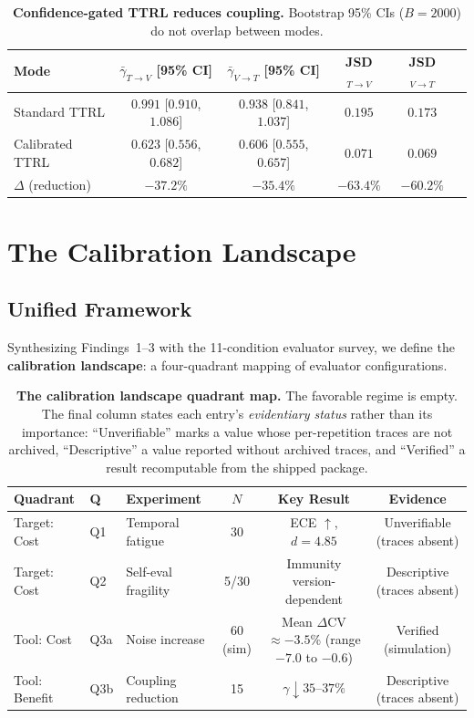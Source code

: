 \documentclass[11pt]{article}
\theoremstyle{definition}
\theoremstyle{remark}
\begin{document}
\begin{table}[H]
\centering
\caption{\textbf{Confidence-gated TTRL reduces coupling.} Bootstrap 95\% CIs ($B{=}2000$) do not overlap between modes.}
\label{tab:coupling}
\begin{tabular}{@{}lccccc@{}}
\toprule
Mode & $\bar{\gamma}_{T \to V}$ [95\% CI] & $\bar{\gamma}_{V \to T}$ [95\% CI] & JSD$_{T \to V}$ & JSD$_{V \to T}$ \\
\midrule
Standard TTRL & $0.991$ [$0.910$, $1.086$] & $0.938$ [$0.841$, $1.037$] & $0.195$ & $0.173$ \\
Calibrated TTRL & $0.623$ [$0.556$, $0.682$] & $0.606$ [$0.555$, $0.657$] & $0.071$ & $0.069$ \\
\midrule
$\Delta$ (reduction) & $-37.2\%$ & $-35.4\%$ & $-63.4\%$ & $-60.2\%$ \\
\bottomrule
\end{tabular}
\end{table}

\section{The Calibration Landscape}

\subsection{Unified Framework}

Synthesizing Findings~1--3 with the 11-condition evaluator survey, we define the \textbf{calibration landscape}: a four-quadrant mapping of evaluator configurations.

\begin{table}[H]
\centering
\caption{\textbf{The calibration landscape quadrant map.} The favorable regime is empty. The final column states each entry's \emph{evidentiary status} rather than its importance: ``Unverifiable'' marks a value whose per-repetition traces are not archived, ``Descriptive'' a value reported without archived traces, and ``Verified'' a result recomputable from the shipped package.}
\begin{tabular}{@{}lllccc@{}}
\toprule
Quadrant & Q & Experiment & $N$ & Key Result & Evidence \\
\midrule
Target: Cost & Q1 & Temporal fatigue & 30 & ECE $\uparrow$, $d{=}4.85$ & Unverifiable (traces absent) \\
Target: Cost & Q2 & Self-eval fragility & 5/30 & Immunity version-dependent & Descriptive (traces absent) \\
Tool: Cost & Q3a & Noise increase & 60 (sim) & Mean $\Delta$CV $\approx -3.5$\% (range $-7.0$ to $-0.6$) & Verified (simulation) \\
Tool: Benefit & Q3b & Coupling reduction & 15 & $\gamma \downarrow 35$--$37\%$ & Descriptive (traces absent) \\
\bottomrule
\end{tabular}
\end{table}
\end{document}
